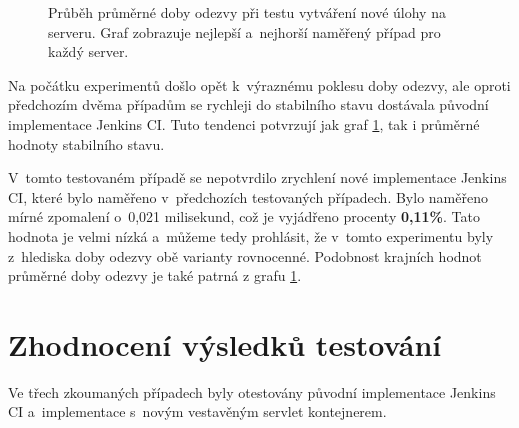             \begin{figure}[h!t]
             \begin{adjustwidth}{-0.5cm}{}
                \begin{center}
                    \caption{Průběh průměrné doby odezvy při testu vytváření nové úlohy na serveru.
                        Graf zobrazuje nejlepší a~nejhorší naměřený případ pro každý server.}
                    \label{imgCreateFreestyleCast}
                \end{center}
             \end{adjustwidth}
            \end{figure}

            Na počátku experimentů došlo opět k~výraznému poklesu doby odezvy, ale oproti
            předchozím dvěma případům se rychleji do stabilního stavu dostávala původní implementace Jenkins CI.
            Tuto tendenci potvrzují jak graf \ref{imgCreateFreestyleCast}, tak i průměrné hodnoty stabilního
            stavu.

            V~tomto testovaném případě se nepotvrdilo zrychlení nové implementace Jenkins CI,
            které bylo naměřeno v~předchozích testovaných případech. Bylo naměřeno
            mírné zpomalení o~0,021 milisekund, což je vyjádřeno procenty \textbf{0,11\%}.
            Tato hodnota je velmi nízká a~můžeme tedy prohlásit, že v~tomto experimentu
            byly z~hlediska doby odezvy obě varianty rovnocenné.
            Podobnost krajních hodnot průměrné doby odezvy je také patrná z grafu \ref{imgCreateFreestyleCast}.


    \section{Zhodnocení výsledků testování} \label{kapPerfVysledky}
        Ve třech zkoumaných případech byly otestovány původní implementace Jenkins CI
        a~implementace s~novým vestavěným servlet kontejnerem.

